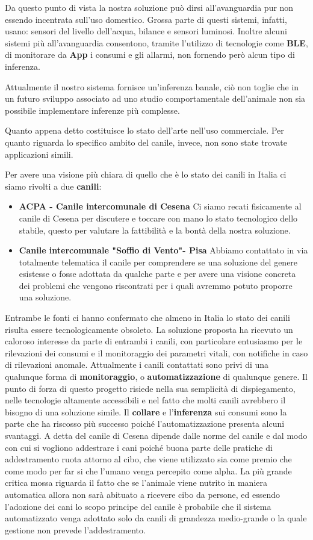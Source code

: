 Da questo punto di vista la nostra soluzione può dirsi all'avanguardia pur non essendo incentrata sull'uso domestico. Grossa parte di questi sistemi, infatti, usano: sensori del livello dell'acqua, bilance e sensori luminosi.
Inoltre alcuni sistemi più all'avanguardia consentono, tramite l'utilizzo di tecnologie come \textbf{BLE}, di monitorare da \textbf{App} i consumi e gli allarmi, non fornendo però alcun tipo di inferenza.

Attualmente il nostro sistema fornisce un'inferenza banale, ciò non toglie che in un futuro sviluppo associato ad uno studio comportamentale dell'animale non sia possibile implementare inferenze più complesse.

Quanto appena detto costituisce lo stato dell'arte nell'uso commerciale.
Per quanto riguarda lo specifico ambito del canile, invece, non sono state trovate applicazioni simili.

Per avere una visione più chiara di quello che è lo stato dei canili in Italia ci siamo rivolti a due \textbf{canili}:
\begin{itemize}
    \item \textbf{ACPA - Canile intercomunale di Cesena} Ci siamo recati fisicamente al canile di Cesena per discutere e toccare con mano lo stato tecnologico dello stabile, questo per valutare la fattibilità e la bontà della nostra soluzione.
    \item \textbf{Canile intercomunale "Soffio di Vento"- Pisa} Abbiamo contattato in via totalmente telematica il canile per comprendere se una soluzione del genere esistesse o fosse adottata da qualche parte e per avere una visione concreta dei problemi che vengono riscontrati per i quali avremmo potuto proporre una soluzione.
\end{itemize}

Entrambe le fonti ci hanno confermato che almeno in Italia lo stato dei canili risulta essere tecnologicamente obsoleto.
La soluzione proposta ha ricevuto un caloroso interesse da parte di entrambi i canili, con particolare entusiasmo per le rilevazioni dei consumi e il monitoraggio dei parametri vitali, con notifiche in caso di rilevazioni anomale.
Attualmente i canili contattati sono privi di una qualunque forma di \textbf{monitoraggio}, o \textbf{automatizzazione} di qualunque genere.
Il punto di forza di questo progetto risiede nella sua semplicità di dispiegamento, nelle tecnologie altamente accessibili e nel fatto che molti canili avrebbero il bisogno di una soluzione simile.
Il \textbf{collare} e l'\textbf{inferenza} sui consumi sono la parte che ha riscosso più successo poiché l'automatizzazione presenta alcuni svantaggi.
A detta del canile di Cesena dipende dalle norme del canile e dal modo con cui si vogliono addestrare i cani poiché buona parte delle pratiche di addestramento ruota attorno al cibo, che viene utilizzato sia come premio che come modo per far si che l'umano venga percepito come alpha.
La più grande critica mossa riguarda il fatto che se l'animale viene nutrito in maniera automatica allora non sarà abituato a ricevere cibo da persone, ed essendo l'adozione dei cani lo scopo principe del canile è probabile che il sistema automatizzato venga adottato solo da canili di grandezza medio-grande o la quale gestione non prevede l'addestramento. 